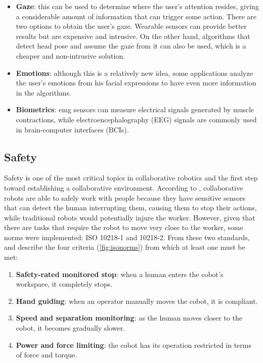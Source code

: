 \begin{itemize}
\item \textbf{Gaze}: this can be used to determine where the user's attention resides, giving a considerable amount of information that can trigger some action. There are two options to obtain the user's gaze. Wearable sensors can provide better results but are expensive and intrusive. On the other hand, algorithms that detect head pose and assume the gaze from it can also be used, which is a cheaper and non-intrusive solution.

\item \textbf{Emotions}: although this is a relatively new idea, some applications analyze the user's emotions from his facial expressions to have even more information in the algorithms.

\item \textbf{Biometrics}: \acf{emg} sensors can measure electrical signals generated by muscle contractions, while electroencephalography (EEG) signals are commonly used in brain-computer interfaces (BCIs). %

\end{itemize}

\subsection{Safety}

Safety is one of the most critical topics in collaborative robotics and the first step toward establishing a collaborative environment. According to \cite{CobotsWW}, collaborative robots are able to safely work with people because they have sensitive sensors that can detect the human interrupting them, causing them to stop their actions, while traditional robots would potentially injure the worker. However, given that there are tasks that require the robot to move very close to the worker, some norms were implemented: ISO 10218-1 and 10218-2. From these two standards, \textcite{Castro2021} and \textcite{Villani2018} describe the four criteria (\autoref{fig:isonorms}) from which at least one must be met:
\begin{enumerate}
  \item \textbf{Safety-rated monitored stop}: when a human enters the cobot's workspace, it completely stops.
  \item \textbf{Hand guiding}: when an operator manually moves the cobot, it is compliant.
  \item \textbf{Speed and separation monitoring}: as the human moves closer to the cobot, it becomes gradually slower.
  \item \textbf{Power and force limiting}: the cobot has its operation restricted in terms of force and torque.
\end{enumerate}

